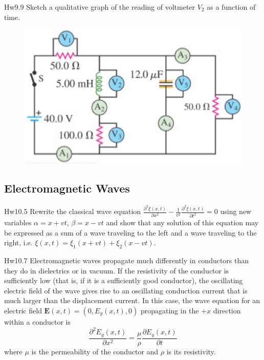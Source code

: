 \documentclass{beamer}
\begin{document}
\begin{frame}{Hw9.9}
    Sketch a qualitative graph of the reading of voltmeter $V_2$ as a function of time.

    \begin{figure}[htbp]
        \centering
        \includegraphics[scale=0.8]{images/hw9_9.png}
    \end{figure}
\end{frame}


\subsection{Electromagnetic Waves}

\begin{frame}{Hw10.5}
    Rewrite the classical wave equation $\frac{\partial^{2} \xi(x, t)}{\partial x^{2}}-\frac{1}{v^{2}} \frac{\partial^{2} \xi(x, t)}{\partial t^{2}}=0$ using new variables $\alpha=x+v t$, $\beta=x-v t$ and show that any solution of this equation may be expressed as a sum of a wave traveling to the left and a wave traveling to the right, i.e. $\xi(x, t)=\xi_{1}(x+v t)+\xi_{2}(x-v t)$.
\end{frame}

\begin{frame}{Hw10.7}
    \small
    Electromagnetic waves propagate much differently in conductors than they do in dielectrics or in vacuum. If the resistivity of the conductor is sufficiently low (that is, if it is a sufficiently good conductor), the oscillating electric field of the wave gives rise to an oscillating conduction current that is much larger than the displacement current. In this case, the wave equation for an electric field $\mathbf{E}(x, t)=\left(0, E_{y}(x, t), 0\right)$ propagating in the $+x$ direction within a conductor is
$$
\frac{\partial^{2} E_{y}(x, t)}{\partial x^{2}}=\frac{\mu}{\rho} \frac{\partial E_{y}(x, t)}{\partial t}
$$
where $\mu$ is the permeability of the conductor and $\rho$ is its resistivity.
\end{frame}
\end{document}
